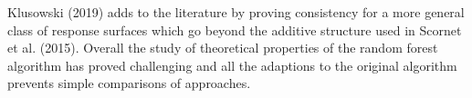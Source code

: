 {Klusowski (2019) adds to the literature by proving consistency for a more general class of response surfaces which go beyond the additive structure used in Scornet et al. (2015). Overall the study of theoretical properties of the random forest algorithm has proved challenging and all the adaptions to the original algorithm prevents simple comparisons of approaches. 
}